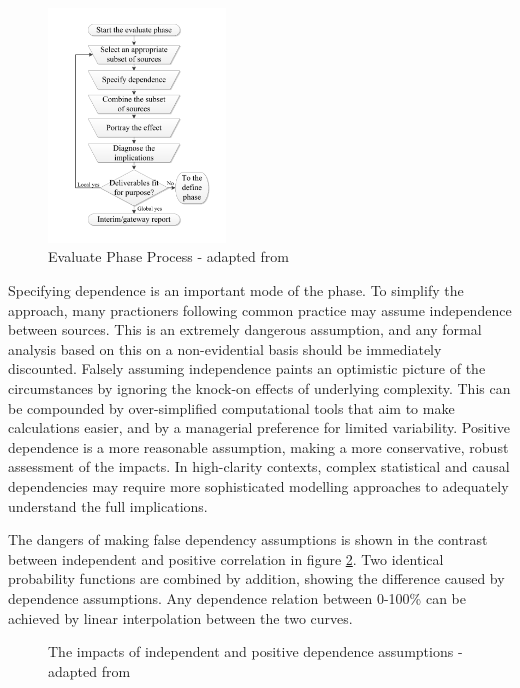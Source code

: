 \begin{figure}[!h]
  \centering
    \includegraphics[width = 0.42\textwidth]{./Figures/Evaluate.pdf} 
\caption{Evaluate Phase Process - adapted from \cite{chapman}}
\label{Figure:Evaluate}
\end{figure}

Specifying dependence is an important mode of the phase.
To simplify the approach, many practioners following common practice may assume independence between sources.
This is an extremely dangerous assumption, and any formal analysis based on this on a non-evidential basis should be immediately discounted.
Falsely assuming independence paints an optimistic picture of the circumstances by ignoring the knock-on effects of underlying complexity.
This can be compounded by over-simplified computational tools that aim to make calculations easier, and by a managerial preference for limited variability. 
Positive dependence is a more reasonable assumption, making a more conservative, robust assessment of the impacts. 
In high-clarity contexts, complex statistical and causal dependencies may require more sophisticated modelling approaches to adequately understand the full implications.

The dangers of making false dependency assumptions is shown in the contrast between independent and positive correlation in figure \ref{Figure:ImpactsDependence}.
Two identical probability functions are combined by addition, showing the difference caused by dependence assumptions.
Any dependence relation between 0-100\% can be achieved by linear interpolation between the two curves.

\begin{figure}[!h]
  \centering
{} \quad
{}
\caption{The impacts of independent and positive dependence assumptions - adapted from \cite{chapman}}
\label{Figure:ImpactsDependence}
\end{figure}

